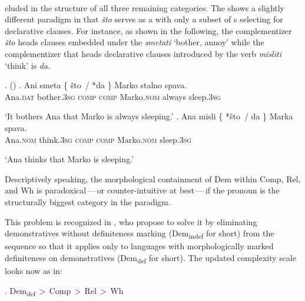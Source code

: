 \noindent 
{}\\
cluded in the structure of all three remaining categories. The  shows a slightly different paradigm in that \textit{\v{s}to} serves as a  with only a subset of s selecting for declarative clauses. For instance, as shown in the following, the complementizer \textit{\v{s}to} heads clauses embedded under the  \textit{smetati} `bother, annoy' while the complementizer that heads declarative clauses introduced by the verb \textit{misliti} `think' is \textit{da}.

\ex.  (\citealt[114]{Mihalicek})
\ag. Ani smeta \{ {\v{s}to \,/} {*da \}} Marko stalno spava.\\
Ana.\textsc{dat} bother.\textsc{3sg} {} {\textsc{comp}} {\textsc{\phantom{l}comp}}  Marko.\textsc{nom} always sleep.\textsc{3sg}\\
\strut `It bothers Ana that Marko is always sleeping.' 
\bg. Ana misli \{ {*\v{s}to \,/} {da \}} Marka spava.\\
Ana.\textsc{nom} think.\textsc{3sg} {} {\phantom{l}\textsc{comp}} {\textsc{comp}}  Marko.\textsc{nom} sleep.\textsc{3sg}\\
\strut `Ana thinks that Marko is sleeping.'

\noindent Descriptively speaking, the morphological containment of Dem within Comp, Rel, and Wh is paradoxical\,---\,or counter-intuitive at best\,---\,if the  pronoun is the structurally biggest category in the paradigm.
\par
This problem is recognized in \cite{BaunazLander2018}, who propose to solve it by eliminating demonstratives without definiteness marking (Dem\textsubscript{indef} for short) from the sequence so that it applies only to languages with morphologically marked definiteness on demonstratives (Dem\textsubscript{def} for short). The updated complexity scale looks now as in:

\ex.\label{dem-def} Dem\textsubscript{def}\,$>$\,Comp\,$>$\,Rel\,$>$\,Wh

